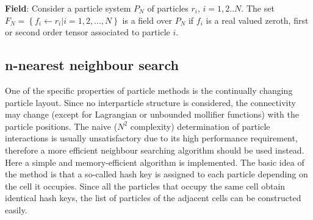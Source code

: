 \documentclass[a4paper,12pt,openany]{book}
\theoremstyle{break}
\begin{document}
\textbf{Field}: Consider a particle system $P_N$ of particles $r_i$, $i=1,2..N$. The set $F_N=\left\{f_i\leftarrow r_i \vert i=1,2,...,N\right\}$ is a field over $P_N$ if $f_i$ is a real valued zeroth, first or second order tensor associated to particle $i$.

\subsection{n-nearest neighbour search} \label{sec:neighbour_search}
One of the specific properties of particle methods is the continually changing particle layout. Since no interparticle structure is considered, the connectivity may change (except for Lagrangian or unbounded mollifier functions) with the particle positions. The naive ($N^2$ complexity) determination of particle interactions is usually unsatisfactory due to its high performance requirement, therefore a more efficient neighbour searching algorithm should be used instead. Here a simple and memory-efficient algorithm is implemented. The basic idea of the method is that a so-called hash key is assigned to each particle depending on the cell it occupies. Since all the particles that occupy the same cell obtain identical hash keys, the list of particles of the adjacent cells can be constructed easily.
\end{document}
